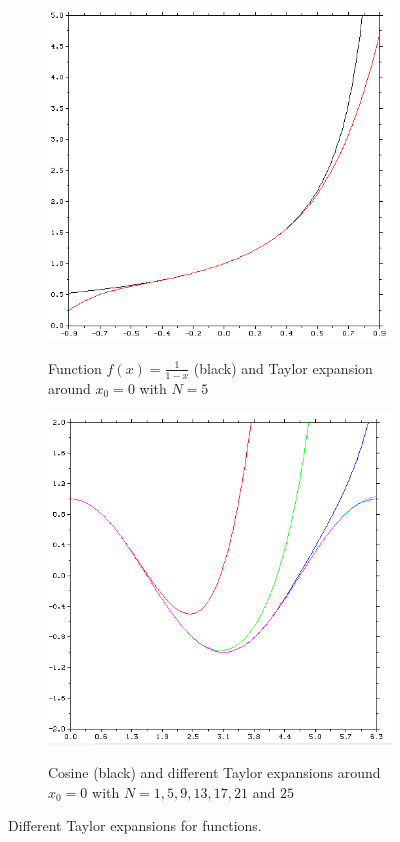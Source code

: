 \begin{figure}
\begin{subfigure}[h]{0.4\textwidth}
        \includegraphics[width = \textwidth]{./doc/Figures/Taylor2.png}  \\
        \caption{Function $f(x) = \frac{1}{1-x}$ (black) and Taylor expansion around $x_0 = 0$ with $N = 5$}
        \label{fig:Taylor2}
    \end{subfigure}    

    \centering
    \begin{subfigure}[h]{0.4\textwidth}
        \centering
        \includegraphics[width = \textwidth]{./doc/Figures/Taylor3.png}  \\
        \caption{Cosine (black) and different Taylor expansions around $x_0 = 0$ with $N = 1, 5, 9, 13, 17, 21$ and $25$}
        \label{fig:Taylor3}
    \end{subfigure}
    \caption{Different Taylor expansions for functions.}   \label{fig:Taylor}
\end{figure}
